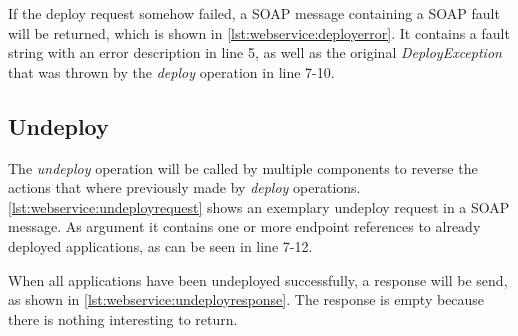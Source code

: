 \vspace*{\baselineskip}

If the deploy request somehow failed, a SOAP message containing a SOAP fault will be returned, which is shown in \autoref{lst:webservice:deployerror}.
It contains a fault string with an error description in line 5, as well as the original \textit{DeployException} that was thrown by the \textit{deploy} operation in line 7-10.

\vspace*{\baselineskip}

\subsection{Undeploy}

The \textit{undeploy} operation will be called by multiple components to reverse the actions that where previously made by \textit{deploy} operations.
\autoref{lst:webservice:undeployrequest} shows an exemplary undeploy request in a SOAP message.
As argument it contains one or more endpoint references to already deployed applications, as can be seen in line 7-12.

\vspace*{\baselineskip}

When all applications have been undeployed successfully, a response will be send, as shown in \autoref{lst:webservice:undeployresponse}.
The response is empty because there is nothing interesting to return.

